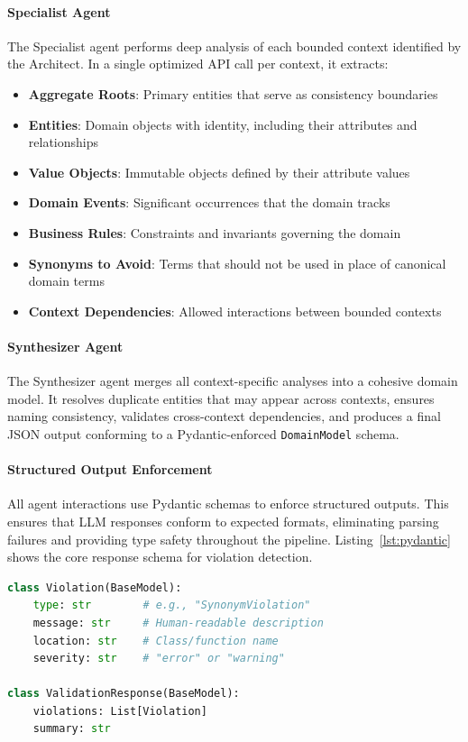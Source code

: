 \documentclass[smallextended]{svjour3}
\begin{document}
\paragraph{Specialist Agent}
The Specialist agent performs deep analysis of each bounded context identified by the Architect.
In a single optimized API call per context, it extracts:
\begin{itemize}
    \item \textbf{Aggregate Roots}: Primary entities that serve as consistency boundaries
    \item \textbf{Entities}: Domain objects with identity, including their attributes and relationships
    \item \textbf{Value Objects}: Immutable objects defined by their attribute values
    \item \textbf{Domain Events}: Significant occurrences that the domain tracks
    \item \textbf{Business Rules}: Constraints and invariants governing the domain
    \item \textbf{Synonyms to Avoid}: Terms that should not be used in place of canonical domain terms
    \item \textbf{Context Dependencies}: Allowed interactions between bounded contexts
\end{itemize}

\paragraph{Synthesizer Agent}
The Synthesizer agent merges all context-specific analyses into a cohesive domain model.
It resolves duplicate entities that may appear across contexts, ensures naming consistency, validates cross-context dependencies, and produces a final JSON output conforming to a Pydantic-enforced \texttt{DomainModel} schema.

\paragraph{Structured Output Enforcement}
All agent interactions use Pydantic schemas to enforce structured outputs.
This ensures that LLM responses conform to expected formats, eliminating parsing failures and providing type safety throughout the pipeline.
Listing~\ref{lst:pydantic} shows the core response schema for violation detection.

\begin{lstlisting}[caption={Pydantic schema for violation detection response}, label={lst:pydantic}, basicstyle=\footnotesize\ttfamily, frame=single, language=Python]
class Violation(BaseModel):
    type: str        # e.g., "SynonymViolation"
    message: str     # Human-readable description
    location: str    # Class/function name
    severity: str    # "error" or "warning"

class ValidationResponse(BaseModel):
    violations: List[Violation]
    summary: str
\end{lstlisting}
\end{document}
